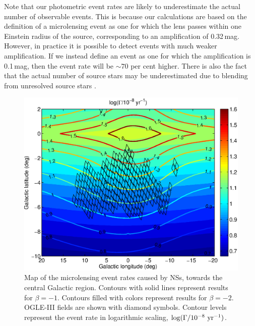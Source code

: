 \documentclass[iop,apj]{emulateapj}
\begin{document}
Note that our photometric event rates are likely to underestimate the
actual number of observable events. This is because our calculations
are based on the definition of a microlensing event as one for which
the lens passes within one Einstein radius of the source,
corresponding to an amplification of 0.32\,mag. However, in practice
it is possible to detect events with much weaker amplification. If we
instead define an event as one for which the amplification is
0.1\,mag, then the event rate will be $\sim70$ per cent higher. There
is also the fact that the actual number of source stars may be
underestimated due to blending from unresolved source stars
\citep[e.g.][]{Smith07}.

%
\begin{figure}
\begin{center}
  \includegraphics[width=3.5 in]{map_event_ns.eps}
%
\caption{Map of the microlensing event rates caused by NSs, towards the central Galactic
region. Contours with solid lines represent results for $\beta=-1$. Contours filled with
colors represent results for $\beta=-2$. OGLE-III fields are shown with diamond symbols. Contour levels
represent the event rate in logarithmic scaling, $\log(\Gamma/10^{-8}\ \rm{yr^{-1}})$. }
\label{map_event}
\end{center}
\end{figure}
%
\end{document}
